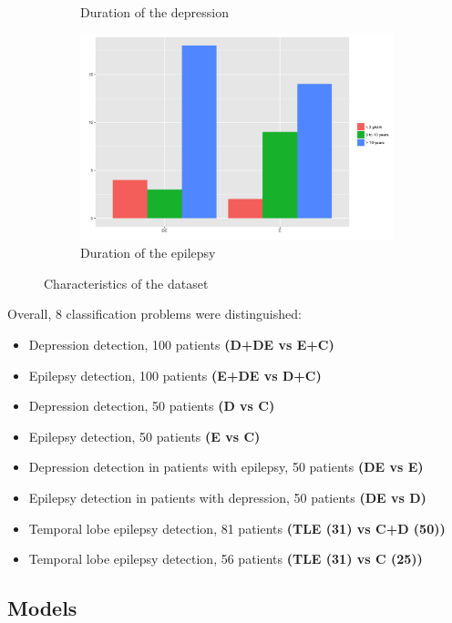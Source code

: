 \documentclass[12pt]{extarticle}
\theoremstyle{definition}
\theoremstyle{remark}
\begin{document}
\begin{figure}[H]
\begin{subfigure}[b]{0.48\textwidth}
			\caption{Duration of the depression}
		\end{subfigure}%
		\begin{subfigure}[b]{0.48\textwidth}
			\centering
			\includegraphics[width=.95\linewidth]{pic/Ep_dur.png}
			\caption{Duration of the epilepsy}
		\end{subfigure}
		\caption{Characteristics of the dataset}\label{fig:dataset}
	\end{figure}
	
	Overall, 8 classification problems were distinguished:
	\begin{itemize}
		\item Depression detection, 100 patients \textbf{(D+DE vs E+C)}
		\item Epilepsy detection, 100 patients \textbf{(E+DE vs D+C)}
		\item Depression detection, 50 patients \textbf{(D vs C)}
		\item Epilepsy detection, 50 patients \textbf{(E vs C)}
		\item Depression detection in patients with epilepsy, 50 patients \textbf{(DE vs E)}
		\item Epilepsy detection in patients with depression, 50 patients \textbf{(DE vs D)}
		\item Temporal lobe epilepsy detection, 81 patients \textbf{(TLE (31) vs C+D (50))}
		\item Temporal lobe epilepsy detection, 56 patients \textbf{(TLE (31) vs C (25))}
	\end{itemize}
	
	
	
	\subsection{Models}
	
\end{document}
